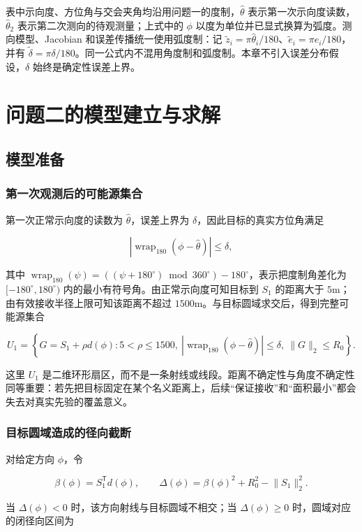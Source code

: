 表中示向度、方位角与交会夹角均沿用问题一的度制，$\hat\theta$ 表示第一次示向度读数，$\hat\theta_2$ 表示第二次测向的待观测量；上式中的 $\phi$ 以度为单位并已显式换算为弧度。测向模型、Jacobian 和误差传播统一使用弧度制：记 $\tilde z_i=\pi\hat\theta_i/180$、$\tilde e_i=\pi e_i/180$，并有 $\tilde\delta=\pi\delta/180$。同一公式内不混用角度制和弧度制。本章不引入误差分布假设，$\delta$ 始终是确定性误差上界。

\section{问题二的模型建立与求解}

\subsection{模型准备}

\subsubsection{第一次观测后的可能源集合}

第一次正常示向度的读数为 $\hat\theta$，误差上界为 $\delta$，因此目标的真实方位角满足

\[
\left|\operatorname{wrap}_{180}(\phi-\hat\theta)\right|\le\delta,
\]

其中 $\operatorname{wrap}_{180}(\psi)=((\psi+180^\circ)\bmod 360^\circ)-180^\circ$，表示把度制角差化为 $[-180^\circ,180^\circ)$ 内的最小有符号角。由正常示向度可知目标到 $S_1$ 的距离大于 $5\mathrm{m}$；由有效接收半径上限可知该距离不超过 $1500\mathrm{m}$。与目标圆域求交后，得到完整可能源集合

\[
U_1=
\left\{
G=S_1+\rho d(\phi):
5<\rho\le1500,\ 
\left|\operatorname{wrap}_{180}(\phi-\hat\theta)\right|\le\delta,\ 
\lVert G\rVert_2\le R_0
\right\}.
\]

这里 $U_1$ 是二维环形扇区，而不是一条射线或线段。距离不确定性与角度不确定性同等重要：若先把目标固定在某个名义距离上，后续“保证接收”和“面积最小”都会失去对真实先验的覆盖意义。

\subsubsection{目标圆域造成的径向截断}

对给定方向 $\phi$，令

\[
\beta(\phi)=S_1^{\mathsf T}d(\phi),
\qquad
\Delta(\phi)=\beta(\phi)^2+R_0^2-\lVert S_1\rVert_2^2.
\]

当 $\Delta(\phi)<0$ 时，该方向射线与目标圆域不相交；当 $\Delta(\phi)\ge0$ 时，圆域对应的闭径向区间为

